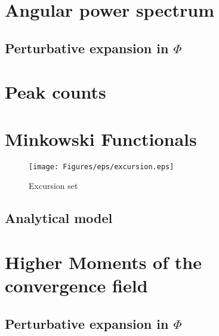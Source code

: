 
\section{Angular power spectrum}

\subsection{Perturbative expansion in $\Phi$}

\section{Peak counts}

\section{Minkowski Functionals}

\begin{figure}
\begin{center}
\texttt{[image: Figures/eps/excursion.eps]}
\end{center}
\caption{Excursion set}
\label{fig:4:excursion}
\end{figure}

\subsection{Analytical model}

\section{Higher Moments of the convergence field}

\subsection{Perturbative expansion in $\Phi$}

